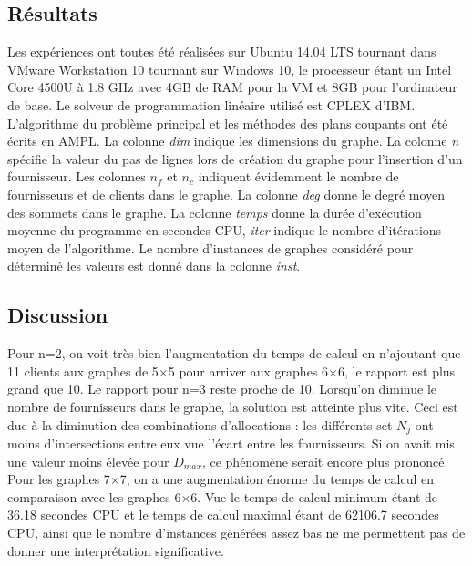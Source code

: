 \documentclass[letterpaper]{article}
\begin{document}
\subsection{Résultats}
Les expériences ont toutes été réalisées sur Ubuntu 14.04 LTS tournant dans VMware Workstation 10 tournant sur Windows 10, le processeur étant un Intel Core 4500U à 1.8 GHz avec 4GB de RAM pour la VM et 8GB pour l'ordinateur de base. Le solveur de programmation linéaire utilisé est CPLEX d'IBM. L'algorithme du problème principal et les méthodes des plans coupants ont été écrits en AMPL.
La colonne \textit{dim} indique les dimensions du graphe. La colonne \textit{n} spécifie la valeur du pas de lignes lors de création du graphe pour l'insertion d'un fournisseur. Les colonnes $n_{f}$ et $n_{c}$ indiquent évidemment le nombre de fournisseurs et de clients dans le graphe. La colonne \textit{deg} donne le degré moyen des sommets dans le graphe. La colonne \textit{temps} donne la durée d'exécution moyenne du programme en secondes CPU, \textit{iter} indique le nombre d'itérations moyen de l'algorithme. Le nombre d'instances de graphes considéré pour déterminé les valeurs est donné dans la colonne \textit{inst}.
\subsection{Discussion}
Pour n=2, on voit très bien l'augmentation du temps de calcul en n'ajoutant que 11 clients aux graphes de 5$\times$5 pour arriver aux graphes 6$\times$6, le rapport est plus grand que 10. Le rapport pour n=3 reste proche de 10. Lorsqu'on diminue le nombre de fournisseurs dans le graphe, la solution est atteinte plus vite. Ceci est due à la diminution des combinations d'allocations : les différents set $N_{j}$ ont moins d'intersections entre eux vue l'écart entre les fournisseurs. Si on avait mis une valeur moins élevée pour $D_{max}$, ce phénomène serait encore plus prononcé.\newline \indent
Pour les graphes 7$\times$7, on a une augmentation énorme du temps de calcul en comparaison avec les graphes 6$\times$6. Vue le temps de calcul minimum étant de 36.18 secondes CPU et le temps de calcul maximal étant de 62106.7 secondes CPU, ainsi que le nombre  d'instances générées assez bas ne me permettent pas de donner une interprétation significative.
\end{document}
